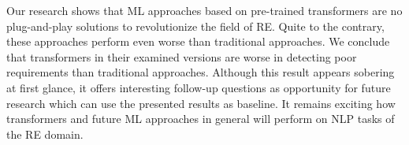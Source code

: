 Our research shows that \ac{ML} approaches based on pre-trained transformers are no plug-and-play solutions to revolutionize the field of \ac{RE}.
Quite to the contrary, these approaches perform even worse than traditional approaches.
We conclude that transformers in their examined versions are worse in detecting poor requirements than traditional approaches.
Although this result appears sobering at first glance, it offers interesting follow-up questions as opportunity for future research which can use the presented results as baseline.
It remains exciting how transformers and future \ac{ML} approaches in general will perform on \ac{NLP} tasks of the \ac{RE} domain.

